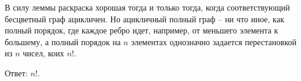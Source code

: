 		В силу леммы раскраска хорошая тогда и только тогда, когда соответствующий бесцветный граф ацикличен. Но ацикличный полный граф -- ни что иное, как полный порядок, где каждое ребро идет, например, от меньшего элемента к большему, а полный порядок на $n$ элементах однозначно задается перестановкой из $n$ чисел, коих $n!$.

		Ответ: $n!$.


